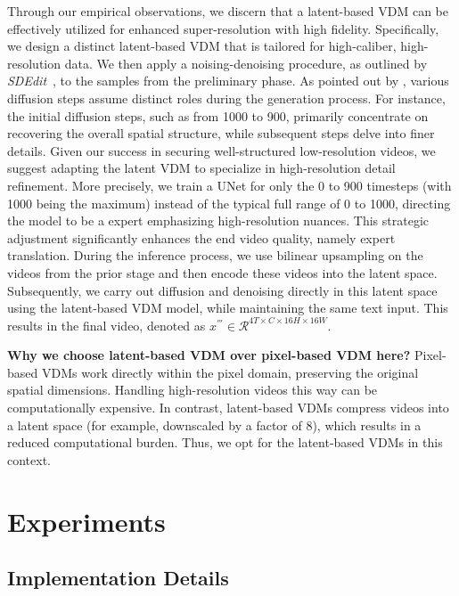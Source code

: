 \documentclass{article} \usepackage{iclr2024_conference,times}
\begin{document}
Through our empirical observations, we discern that a latent-based VDM can be effectively utilized for enhanced super-resolution with high fidelity. Specifically, we design a distinct latent-based VDM that is tailored for high-caliber, high-resolution data. We then apply a noising-denoising procedure, as outlined by \emph{SDEdit}~\citep{meng2021sdedit}, to the samples from the preliminary phase. As pointed out by \citep{balaji2022ediffi}, various diffusion steps assume distinct roles during the generation process. For instance, the initial diffusion steps, such as from 1000 to 900, primarily concentrate on recovering the overall spatial structure, while subsequent steps delve into finer details. Given our success in securing well-structured low-resolution videos, we suggest adapting the latent VDM to specialize in high-resolution detail refinement. More precisely, we train a UNet for only the 0 to 900 timesteps (with 1000 being the maximum) instead of the typical full range of 0 to 1000, directing the model to be a expert emphasizing high-resolution nuances. This strategic adjustment significantly enhances the end video quality, namely expert translation. 
During the inference process, we use bilinear upsampling on the videos from the prior stage and then encode these videos into the latent space. Subsequently, we carry out diffusion and denoising directly in this latent space using the latent-based VDM model, while maintaining the same text input. This results in the final video, denoted as 
  \(x^{'''} \in \mathcal{R}^{4T \times C \times 16H \times 16W}\).  
  
\noindent\textbf{Why we choose latent-based VDM over pixel-based VDM here?}  Pixel-based VDMs work directly within the pixel domain, preserving the original spatial dimensions. Handling high-resolution videos this way can be computationally expensive. In contrast, latent-based VDMs compress videos into a latent space (for example, downscaled by a factor of 8), which results in a reduced computational burden. Thus, we opt for the latent-based VDMs in this context.


\vspace{-2mm}

\section{Experiments}






\subsection{Implementation Details}
\end{document}
